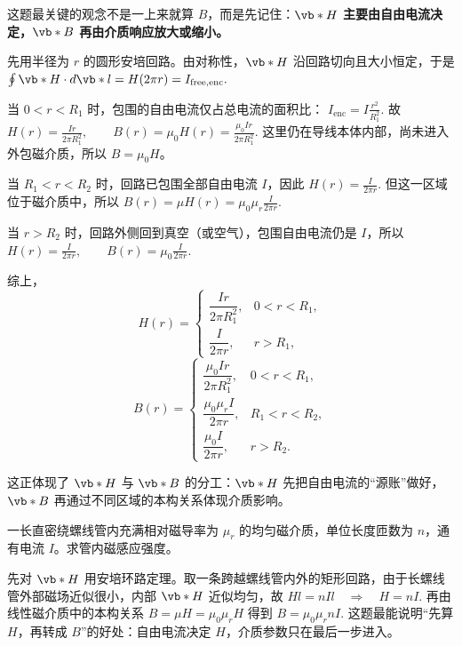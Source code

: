\documentclass[lang=cn,11pt]{elegantbook}
\begin{document}
\begin{solution}
这题最关键的观念不是一上来就算 \(B\)，而是先记住：\textbf{\(\vb*{H}\) 主要由自由电流决定，\(\vb*{B}\) 再由介质响应放大或缩小。}

先用半径为 \(r\) 的圆形安培回路。由对称性，\(\vb*{H}\) 沿回路切向且大小恒定，于是
 \(\oint \vb*{H}\cdot d\vb*{l}=H(2\pi r)=I_{\mathrm{free,enc}}.\) 

当 \(0<r<R_1\) 时，包围的自由电流仅占总电流的面积比：
 \(I_{\mathrm{enc}}=I\frac{r^2}{R_1^2}.\) 
故
 \(H(r)=\frac{Ir}{2\pi R_1^2}, \qquad B(r)=\mu_0H(r)=\frac{\mu_0Ir}{2\pi R_1^2}.\) 
这里仍在导线本体内部，尚未进入外包磁介质，所以 \(B=\mu_0H\)。

当 \(R_1<r<R_2\) 时，回路已包围全部自由电流 \(I\)，因此
 \(H(r)=\frac{I}{2\pi r}.\) 
但这一区域位于磁介质中，所以
 \(B(r)=\mu H(r)=\mu_0\mu_r\frac{I}{2\pi r}.\) 

当 \(r>R_2\) 时，回路外侧回到真空（或空气），包围自由电流仍是 \(I\)，所以
 \(H(r)=\frac{I}{2\pi r}, \qquad B(r)=\mu_0\frac{I}{2\pi r}.\) 

综上，
\[
H(r)=
\begin{cases}
\dfrac{Ir}{2\pi R_1^2}, & 0<r<R_1,\\[6pt]
\dfrac{I}{2\pi r}, & r>R_1,
\end{cases}
\]
\[
B(r)=
\begin{cases}
\dfrac{\mu_0Ir}{2\pi R_1^2}, & 0<r<R_1,\\[6pt]
\dfrac{\mu_0\mu_rI}{2\pi r}, & R_1<r<R_2,\\[6pt]
\dfrac{\mu_0I}{2\pi r}, & r>R_2.
\end{cases}
\]

这正体现了 \(\vb*{H}\) 与 \(\vb*{B}\) 的分工：\(\vb*{H}\) 先把自由电流的“源账”做好，\(\vb*{B}\) 再通过不同区域的本构关系体现介质影响。
\end{solution}

\begin{exercise}[充满磁介质的长直螺线管]
一长直密绕螺线管内充满相对磁导率为 \(\mu_r\) 的均匀磁介质，单位长度匝数为 \(n\)，通有电流 \(I\)。求管内磁感应强度。
\end{exercise}

\begin{solution}
先对 \(\vb*{H}\) 用安培环路定理。取一条跨越螺线管内外的矩形回路，由于长螺线管外部磁场近似很小，内部 \(\vb*{H}\) 近似均匀，故
 \(Hl=nIl \quad\Longrightarrow\quad H=nI.\) 
再由线性磁介质中的本构关系
 \(B=\mu H=\mu_0\mu_r H\) 
得到
 \(\boxed{ B=\mu_0\mu_r nI }.\) 
这题最能说明“先算 \(H\)，再转成 \(B\)”的好处：自由电流决定 \(H\)，介质参数只在最后一步进入。
\end{solution}
\end{document}
